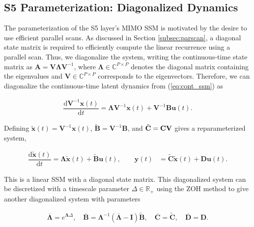 \subsection{S5 Parameterization: Diagonalized Dynamics}
\label{subsec:simpleparam}

The parameterization of the S5 layer's MIMO SSM is motivated by the desire to use efficient parallel scans. As discussed in Section \ref{subsec:parscan}, a diagonal state matrix is required to efficiently compute the linear recurrence using a parallel scan. Thus, we diagonalize the system, writing the continuous-time state matrix as  $\mathbf{A}=\mathbf{V}\mathbf{\Lambda}\mathbf{V}^{-1}$, where $\mathbf{\Lambda}\in \mathbb{C}^{P \times P}$ denotes the diagonal matrix containing the eigenvalues and $\mathbf{V} \in \mathbb{C}^{P \times P}$ corresponds to the eigenvectors.  Therefore, we can diagonalize the continuous-time latent dynamics from (\ref{eq:cont_ssm}) as

\begin{align}
    \dfrac{\mathrm{d} \mathbf{V}^{-1}\mathbf{x}(t)}{\mathrm{d} t} = \boldsymbol\Lambda \mathbf{V}^{-1}\mathbf{x}(t) + \mathbf{V}^{-1}\mathbf{B}\mathbf{u}(t).
    \label{eq:S5eigenbasis}
\end{align}

Defining $\tilde{\mathbf{x}}(t)= \mathbf{V}^{-1}\mathbf{x}(t)$, $\tilde{\mathbf{B}}= \mathbf{V}^{-1}\mathbf{B}$, and  $\Tilde{\mathbf{C}}=\mathbf{C}\mathbf{V}$ gives a reparameterized system,

\begin{align}
    \dfrac{\mathrm{d} \tilde{\mathbf{x}}(t)}{\mathrm{d} t} = \mathbf{\Lambda} \tilde{\mathbf{x}}(t) + \tilde{\mathbf{B}}\mathbf{u}(t), \quad \quad \mathbf{y}(t) &= \tilde{\mathbf{C}}\tilde{\mathbf{x}}(t) +  \mathbf{D}\mathbf{u}(t).
    \label{eq:S5ssm} 
\end{align}

This is a linear SSM with a diagonal state matrix. This diagonalized system can be discretized with a timescale parameter $\Delta\in \mathbb{R}_+$ using the ZOH method to give another diagonalized system with parameters

\begin{align}
    \label{eq:diag_disc_params}
    \overline{\mathbf{\Lambda}} = e^{\mathbf{\Lambda}\Delta}, \quad \overline{\mathbf{B}} = \mathbf{\Lambda}^{-1}(\overline{\mathbf{\Lambda}}-\mathbf{I})\tilde{\mathbf{B}}, \quad \overline{\mathbf{C}} = \tilde{\mathbf{C}}, \quad \overline{\mathbf{D}} = \mathbf{D}. 
\end{align}

